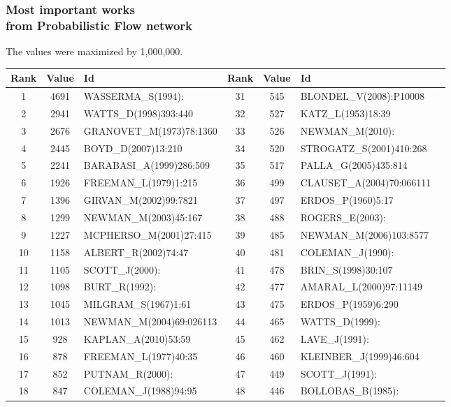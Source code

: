 \documentclass[hyperref={pdfstartview={FitBH -32768},
                         pdfpagemode=FullScreen,
                         plainpages=false,
                         colorlinks=true}
              ]{beamer}
\begin{document}
\begin{frame}[fragile]
\frametitle{Most important works \\ \normalsize from Probabilistic  Flow network}
\small

\renewcommand{\arraystretch}{0.82}
\tiny
The values were maximized by 1,000,000. 
\begin{tabular}{c|c|l||c|c|l|l}
Rank&   	Value&   	Id&   	Rank&   	Value&   	Id\\ \hline
1&   	4691&   	WASSERMA\_S(1994):&   	31&   	545&   	BLONDEL\_V(2008):P10008\\
2&   	2941&   	WATTS\_D(1998)393:440&   	32&   	527&   	KATZ\_L(1953)18:39\\
3&   	2676&   	GRANOVET\_M(1973)78:1360&   	33&   	526&   	NEWMAN\_M(2010):\\
4&   	2445&   	BOYD\_D(2007)13:210&   	34&   	520&   	STROGATZ\_S(2001)410:268\\
5&   	2241&   	BARABASI\_A(1999)286:509&   	35&   	517&   	PALLA\_G(2005)435:814\\
6&   	1926&   	FREEMAN\_L(1979)1:215&   	36&   	499&   	CLAUSET\_A(2004)70:066111\\
7&   	1396&   	GIRVAN\_M(2002)99:7821&   	37&   	497&   	ERDOS\_P(1960)5:17\\
8&   	1299&   	NEWMAN\_M(2003)45:167&   	38&   	488&   	ROGERS\_E(2003):\\
9&   	1227&   	MCPHERSO\_M(2001)27:415&   	39&   	485&   	NEWMAN\_M(2006)103:8577\\
10&   	1158&   	ALBERT\_R(2002)74:47&   	40&   	481&   	COLEMAN\_J(1990):\\
11&   	1105&   	SCOTT\_J(2000):&   	41&   	478&   	BRIN\_S(1998)30:107\\
12&   	1098&   	BURT\_R(1992):&   	42&   	477&   	AMARAL\_L(2000)97:11149\\
13&   	1045&   	MILGRAM\_S(1967)1:61&   	43&   	475&   	ERDOS\_P(1959)6:290\\
14&   	1013&   	NEWMAN\_M(2004)69:026113&   	44&   	465&   	WATTS\_D(1999):\\
15&   	928&   	KAPLAN\_A(2010)53:59&   	45&   	462&   	LAVE\_J(1991):\\
16&   	878&   	FREEMAN\_L(1977)40:35&   	46&   	460&   	KLEINBER\_J(1999)46:604\\
17&   	852&   	PUTNAM\_R(2000):&   	47&   	449&   	SCOTT\_J(1991):\\
18&   	847&   	COLEMAN\_J(1988)94:95&   	48&   	446&   	BOLLOBAS\_B(1985):\\

\end{tabular}
\end{frame}
\end{document}
